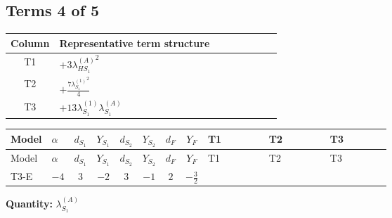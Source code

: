 \documentclass[8pt]{article}
\begin{document}
\begin{landscape}
\subsection*{Terms 4 of 5}
\begin{center}
\begin{tabular}{@{}c >{\raggedright\arraybackslash}p{0.82\linewidth}@{}}
\toprule
Column & Representative term structure \\
\midrule
T1 & \(\displaystyle +3 {\lambda_{HS_1}^{(A)}}^2\) \\
\midrule
T2 & \(\displaystyle +\frac{7 {\lambda_{S_1}^{(1)}}^2}{4}\) \\
\midrule
T3 & \(\displaystyle +13 {\lambda_{S_1}^{(1)}} {\lambda_{S_1}^{(A)}}\) \\
\midrule
\bottomrule
\end{tabular}
\end{center}
\smallskip
\tiny
\begin{longtable}{@{}llcccccc >{\raggedright\arraybackslash}p{0.21\linewidth} >{\raggedright\arraybackslash}p{0.21\linewidth} >{\raggedright\arraybackslash}p{0.21\linewidth}@{}}
\toprule
Model & $\alpha$ & $d_{S_1}$ & $Y_{S_1}$ & $d_{S_2}$ & $Y_{S_2}$ & $d_F$ & $Y_F$ & T1 & T2 & T3 \\
\midrule
\endfirsthead
\toprule
Model & $\alpha$ & $d_{S_1}$ & $Y_{S_1}$ & $d_{S_2}$ & $Y_{S_2}$ & $d_F$ & $Y_F$ & T1 & T2 & T3 \\
\midrule
\endhead
T3-E & $-4$ & $3$ & $-2$ & $3$ & $-1$ & $2$ & $-\frac{3}{2}$ & \scriptsize\adjustbox{max width=\linewidth}{$\begin{gathered} +3 {\lambda_{HS_1}^{(A)}}^2\end{gathered}$} & \scriptsize\adjustbox{max width=\linewidth}{$\begin{gathered} +\frac{7 {\lambda_{S_1}^{(1)}}^2}{4}\end{gathered}$} & \scriptsize\adjustbox{max width=\linewidth}{$\begin{gathered} +13 {\lambda_{S_1}^{(1)}} {\lambda_{S_1}^{(A)}}\end{gathered}$} \\
\midrule
\bottomrule
\end{longtable}
\clearpage
\noindent\textbf{Quantity: }$\lambda_{S_1}^{(A)}$\par\smallskip

\end{landscape}
\end{document}
